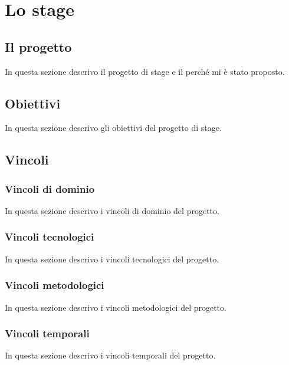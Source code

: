 
\chapter{Lo stage}
\label{cap:stage}
\section{Il progetto}
In questa sezione descrivo il progetto di stage e il perché mi è stato proposto. 

\section{Obiettivi}
In questa sezione descrivo gli obiettivi del progetto di stage.

\section{Vincoli}

\subsection{Vincoli di dominio}
In questa sezione descrivo i vincoli di dominio del progetto.

\subsection{Vincoli tecnologici}
In questa sezione descrivo i vincoli tecnologici del progetto.

\subsection{Vincoli metodologici}
In questa sezione descrivo i vincoli metodologici del progetto.

\subsection{Vincoli temporali}
In questa sezione descrivo i vincoli temporali del progetto.
